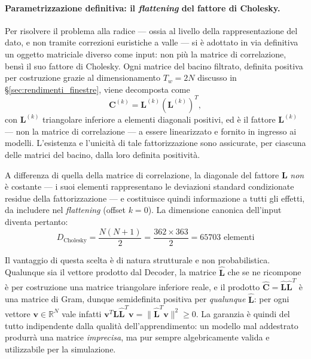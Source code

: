\paragraph{Parametrizzazione definitiva: il \emph{flattening} del fattore di Cholesky.} Per risolvere il problema alla radice --- ossia al livello della rappresentazione del dato, e non tramite correzioni euristiche a valle --- si è adottato in via definitiva un oggetto matriciale diverso come input: non più la matrice di correlazione, bensì il suo fattore di Cholesky. Ogni matrice del bacino filtrato, definita positiva per costruzione grazie al dimensionamento $T_w = 2N$ discusso in \S\ref{sec:rendimenti_finestre}, viene decomposta come
\begin{equation}
\mathbf{C}^{(k)} = \mathbf{L}^{(k)} \left( \mathbf{L}^{(k)} \right)^T ,
\end{equation}
con $\mathbf{L}^{(k)}$ triangolare inferiore a elementi diagonali positivi, ed è il fattore $\mathbf{L}^{(k)}$ --- non la matrice di correlazione --- a essere linearizzato e fornito in ingresso ai modelli. L'esistenza e l'unicità di tale fattorizzazione sono assicurate, per ciascuna delle matrici del bacino, dalla loro definita positività.

A differenza di quella della matrice di correlazione, la diagonale del fattore $\mathbf{L}$ \emph{non} è costante --- i suoi elementi rappresentano le deviazioni standard condizionate residue della fattorizzazione --- e costituisce quindi informazione a tutti gli effetti, da includere nel \emph{flattening} (offset $k=0$). La dimensione canonica dell'input diventa pertanto:
\begin{equation}
D_{\text{Cholesky}} = \frac{N(N + 1)}{2} = \frac{362 \times 363}{2} = 65703 \text{ elementi}
\end{equation}

Il vantaggio di questa scelta è di natura strutturale e non probabilistica. Qualunque sia il vettore prodotto dal Decoder, la matrice $\hat{\mathbf{L}}$ che se ne ricompone è per costruzione una matrice triangolare inferiore reale, e il prodotto $\hat{\mathbf{C}} = \hat{\mathbf{L}}\hat{\mathbf{L}}^T$ è una matrice di Gram, dunque semidefinita positiva per \emph{qualunque} $\hat{\mathbf{L}}$: per ogni vettore $\mathbf{v} \in \mathbb{R}^N$ vale infatti $\mathbf{v}^T \hat{\mathbf{L}}\hat{\mathbf{L}}^T \mathbf{v} = \lVert \hat{\mathbf{L}}^T \mathbf{v} \rVert^2 \geq 0$. La garanzia è quindi del tutto indipendente dalla qualità dell'apprendimento: un modello mal addestrato produrrà una matrice \emph{imprecisa}, ma pur sempre algebricamente valida e utilizzabile per la simulazione.

